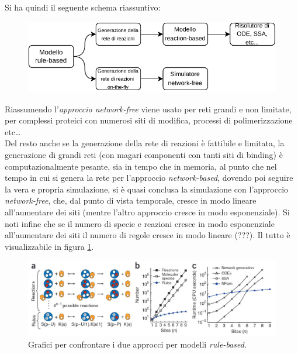 \documentclass[a4paper,12pt, oneside]{book}
\begin{document}
Si ha quindi il seguente schema riassuntivo:
\begin{figure}[H]
  \centering
  \includegraphics[scale = 1]{img/rulesimu.pdf}
\end{figure}
Riassumendo l'\textit{approccio network-free} viene usato per reti grandi e non
limitate, per complessi proteici con numerosi siti di modifica, processi di
polimerizzazione etc\ldots\\
Del resto anche se la generazione della rete di reazioni è fattibile e limitata,
la generazione di grandi reti (con magari componenti con tanti siti di binding)
è computazionalmente pesante, sia in tempo che  
in memoria, al punto che nel tempo in cui si genera la rete per l'approccio
\textit{network-based}, dovendo poi seguire la vera e propria simulazione, si è
quasi conclusa la simulazione con l'approccio \textit{network-free}, che, dal
punto di vista temporale, cresce in modo lineare all'aumentare dei siti (mentre
l'altro approccio cresce in modo esponenziale). Si noti
infine che se il numero di specie e reazioni cresce in modo esponenziale
all'aumentare dei siti il numero di regole cresce in modo lineare (???). Il
tutto è visualizzabile in figura \ref{fig:nfsim}.
\begin{figure}
  \centering
  \includegraphics[width = \textwidth]{img/nfsim.jpg}
  \caption{Grafici per confrontare i due approcci per modelli
    \textit{rule-based}.}
  \label{fig:nfsim}
\end{figure}
\end{document}
